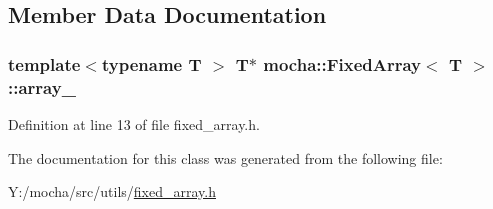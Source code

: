 \subsection{Member Data Documentation}
\hypertarget{classmocha_1_1_fixed_array_a14f9426748f9a44173cd4541131b8617}{
\subsubsection[{array\_\-}]{\setlength{\rightskip}{0pt plus 5cm}template$<$typename T $>$ T$\ast$ {\bf mocha::FixedArray}$<$ T $>$::{\bf array\_\-}}}
\label{classmocha_1_1_fixed_array_a14f9426748f9a44173cd4541131b8617}


Definition at line 13 of file fixed\_\-array.h.



The documentation for this class was generated from the following file:\begin{DoxyCompactItemize}
\item 
Y:/mocha/src/utils/\hyperlink{fixed__array_8h}{fixed\_\-array.h}\end{DoxyCompactItemize}
